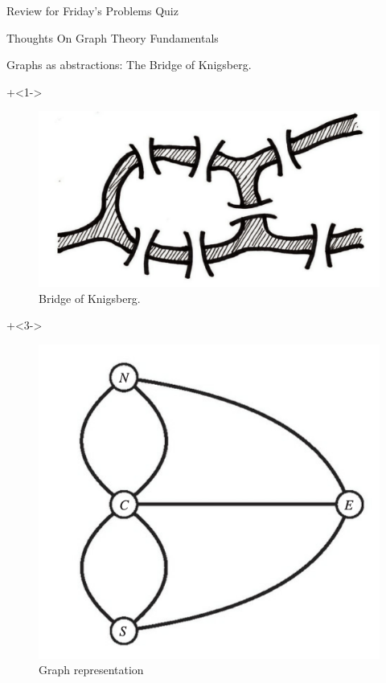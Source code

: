 \documentclass[10pt]{beamer}
\begin{document}
\begin{frame}[standout]
Review for Friday's Problems Quiz
\end{frame}



\begin{frame}[standout]
Thoughts On Graph Theory Fundamentals
\end{frame}


\begin{frame}{Graphs as abstractions: The Bridge of Knigsberg.}

\small 

\begin{minipage}{.47\textwidth}

\onslide+<1->\begin{figure}
\includegraphics[width=.8\linewidth]{images/konigsberg.png}	
\caption{Bridge of Knigsberg.}
\end{figure}
\end{minipage} %
\hfill 
\begin{minipage}{.47\textwidth}
\onslide+<3->\begin{figure}
\includegraphics[width=.8\linewidth]{images/konigsberg_graph.png}
\caption{Graph representation}	
\end{figure}


\end{minipage}
\end{frame}
\end{document}
